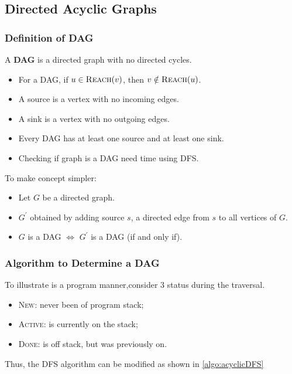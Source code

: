 \subsection{Directed Acyclic Graphs}
\subsubsection{Definition of DAG}
A \textbf{DAG} is a directed graph with no directed cycles.
\begin{itemize}
    \item For a DAG, if $u \in \textsc{Reach} (v)$,
        then $v \notin \textsc{Reach} (u)$.
    \item A source is a vertex with no incoming edges.
    \item A sink is a vertex with no outgoing edges.
    \item Every DAG has at least one source and at least one sink.
    \item Checking if graph is a DAG need  time using DFS.
\end{itemize}
To make concept simpler:
\begin{itemize}
    \item Let $G$ be a directed graph.
    \item $G^\prime$ obtained by adding source $s$, a directed edge from
        $s$ to all vertices of $G$.
    \item $G$ is a DAG $\iff$ $G^\prime$ is a DAG (if and only if).
\end{itemize}

\subsubsection{Algorithm to Determine a DAG}
To illustrate is a program manner,consider 3 status during the traversal.
\begin{itemize}
    \item \textsc{New}: never been of program stack;
    \item \textsc{Active}: is currently on the stack;
    \item \textsc{Done}: is off stack, but was previously on.
\end{itemize}
Thus, the DFS algorithm can be modified as shown in \cref{algo:acyclicDFS}

